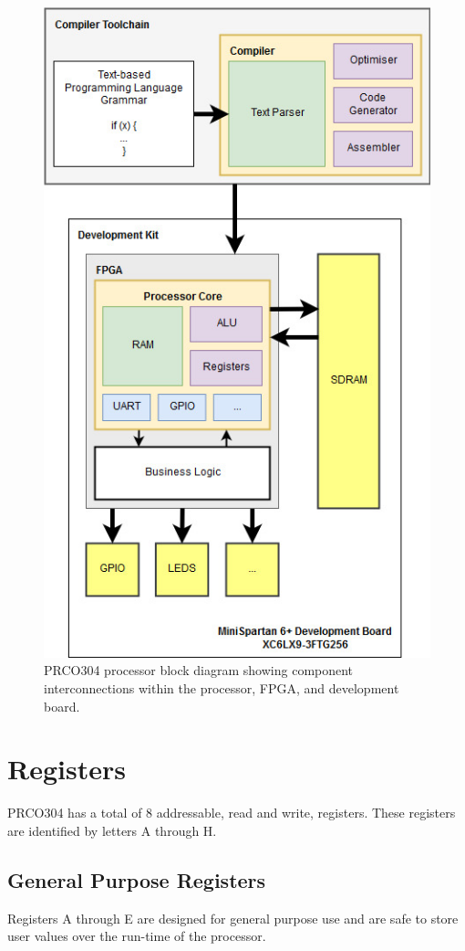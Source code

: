 \documentclass[11pt,a4paper]{report}
\newcommand{\scname}{PRCO304}
\begin{document}
\begin{figure}[H]
\begin{center}
\includegraphics[scale=0.5]{hld}
\end{center}
\caption{\scname{} processor block diagram showing component interconnections within the processor, FPGA, and development board.}
\label{fig:core_hld}
\end{figure}

\section{Registers}
\scname{} has a total of 8 addressable, read and write, registers. These registers are identified by letters A through H.

\subsection{General Purpose Registers}
Registers A through E are designed for general purpose use and are safe to store user values over the run-time of the processor.
\end{document}
